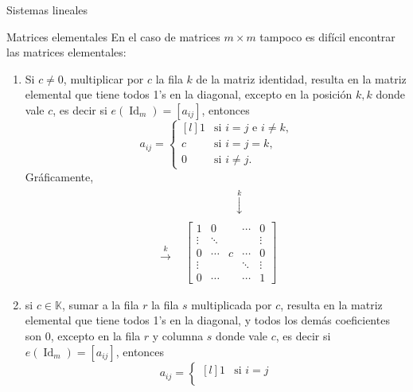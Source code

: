 \documentclass[a4paper,12pt,twoside,spanish,reqno]{amsbook}
\theoremstyle{definition}
\theoremstyle{remark}
\newcommand{\Id}{\operatorname{Id}}
\newcommand{\K}{\mathbb K}
\begin{document}
\begin{chapter}{Sistemas lineales}
\begin{section}{Matrices elementales}
			En el caso de matrices $m \times m$ tampoco es difícil encontrar las matrices elementales:
			\begin{enumerate}
				\item Si $c \not=0$, multiplicar por  $c$ la fila $k$ de la matriz identidad, resulta en la matriz elemental que tiene todos 1's en la diagonal, excepto en la posición $k,k$ donde vale $c$,  es decir si $e(\Id_m) = [a_{ij}]$,  entonces
				\begin{equation}\label{elem-tipo-1}
				a_{ij} = \left\{ 
				\begin{matrix*}[l]
				1 &\text{si $i=j$ e $i\ne k$,}\\
				c &\text{si $i=j=k$,} \\
				0 \quad&\text{si $i \ne j$.}
				\end{matrix*}\right.
				\end{equation}
				Gráficamente,
				\begin{align*}
				&\begin{matrix}
				{}^{}&{}^{}&{}^{}&{}^{}&{}^{}&\overset{k}{\downarrow}&{}^{}&{}^{}&{}^{}
				\end{matrix} \\
				\begin{matrix}
				{}^{}\\
				{}^{}\\
				\overset{k}{\to}\\
				{}^{}\\
				{}^{}
				\end{matrix}
				&\begin{bmatrix}
				1 & 0 &  &\cdots & 0  \\
				\vdots  & \ddots  & & & \vdots \\
				0 & \cdots &c &\cdots &0 \\
				\vdots  &   & &\ddots & \vdots \\
				0  & \cdots  & &\cdots & 1
				\end{bmatrix}
				\end{align*}
				\item si  $c \in \K$, sumar a la fila $r$  la fila $s$ multiplicada por $c$, resulta en la matriz elemental que tiene todos 1's en la diagonal, y todos los demás coeficientes son 0,  excepto en la fila  $r$ y columna $s$ donde  vale $c$,  es decir si $e(\Id_m) = [a_{ij}]$,  entonces
				\begin{equation}\label{elem-tipo-2}
				a_{ij} = \left\{ 
				\begin{matrix*}[l]
				1 &\text{si $i=j$}\\

\end{matrix*}
\end{equation}
\end{enumerate}
\end{section}
\end{chapter}
\end{document}
